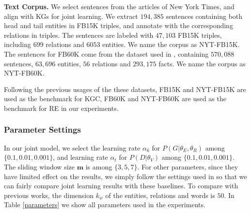 \documentclass[11pt,a4paper]{article}
\begin{document}
\textbf{Text Corpus.} We select sentences from the articles of New York Times, and align with KGs for joint learning. We extract $194,385$ sentences containing both head and tail entities in FB15K triples, and annotate with the corresponding relations in triples. The sentences are labeled with $47,103$ FB15K triples, including $699$ relations and $6053$ entities. We name the corpus as NYT-FB15K. The sentences for FB60K come from the dataset used in \cite{riedel2010modeling}, containing $570,088$ sentences, $63,696$ entities, $56$ relations and $293,175$ facts. We name the corpus as NYT-FB60K.
 
Following the previous usages of the these datasets, FB15K and NYT-FB15K are used as the benchmark for KGC, FB60K and NYT-FB60K are used as the benchmark for RE in our experiments.







\subsubsection{Parameter Settings}

In our joint model, we select the learning rate $\alpha_k$ for $P(G|{\theta_E,\theta_R})$ among $\{0.1, 0.01, 0.001\}$, and learning rate $\alpha_t$ for $P(D|{\theta_V})$ among $\{0.1, 0.01, 0.001\}$. The sliding window size $\mathbf{m}$ is among $\{3,5,7\}$. For other parameters, since they have limited effect on the results, we simply follow the settings used in \cite{zeng2014relation,lin2016neural} so that we can fairly compare joint learning results with these baselines. To compare with previous works, the dimension $k_w$ of the entities, relations and words is $50$. In Table \ref{parameters} we show all parameters used in the experiments.
\end{document}
